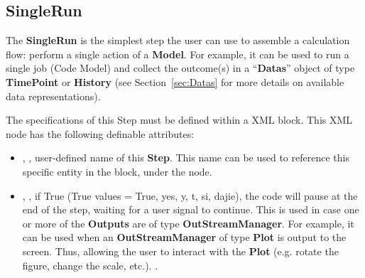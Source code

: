 \subsection{SingleRun}
\label{subsec:stepSingleRun}
The \textbf{SingleRun} is the simplest step the user can use to assemble a
calculation flow: perform a single action of a \textbf{Model}.
%
For example, it can be used to run a single job (Code Model) and collect the
outcome(s) in a ``\textbf{Datas}'' object of type \textbf{TimePoint} or 
\textbf{History} (see Section~\ref{sec:Datas} for more details on available data
representations).

The specifications of this Step must be defined within a  XML
block.
%
This XML node has the following definable attributes:
\vspace{-5mm}
\begin{itemize}
\itemsep0em
\item {}, , user-defined name of
this \textbf{Step}. \nb This name can be used to reference this specific entity
in the  block, under the  node.
\item {}, , if True
(True values = True, yes, y, t, si, dajie), the code will pause at the end of
the step, waiting for a user signal to continue. This is used in case one or
more of the \textbf{Outputs} are of type \textbf{OutStreamManager}.
For example, it can be used when an \textbf{OutStreamManager} of type
\textbf{Plot} is output to the screen. Thus, allowing the user to interact with
the \textbf{Plot} (e.g. rotate the figure, change the scale, etc.).
.
\end{itemize}

